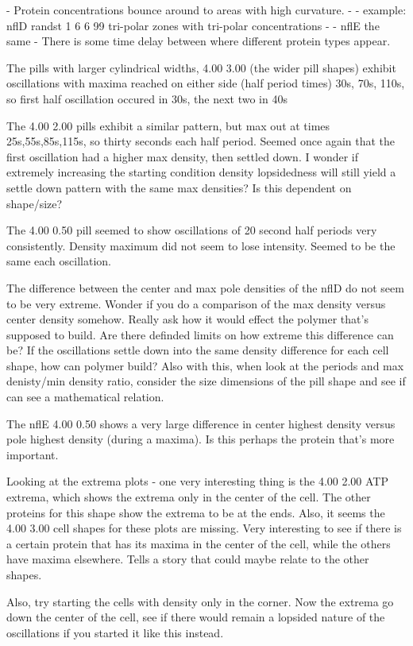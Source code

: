 \documentclass[letterpaper,twocolumn,amsmath,amssymb,pre]{revtex4-1}
\begin{document}
- Protein concentrations bounce around to areas with high curvature.
- - example: nflD randst 1 6 6 99 tri-polar zones with tri-polar concentrations
- - nflE the same
- There is some time delay between where different protein types appear.

The pills with larger cylindrical widths, 4.00 3.00 (the wider pill shapes)
exhibit oscillations with maxima reached on either side (half period
times) 30s, 70s, 110s, so first half oscillation occured in 30s, the
next two in 40s

The 4.00 2.00 pills exhibit a similar pattern, but max out at times
25s,55s,85s,115s, so thirty seconds each half period.  Seemed once again that
the first oscillation had a higher max density, then settled down.  I
wonder if extremely increasing the starting condition density
lopsidedness will still yield a settle down pattern with the same max
densities?  Is this dependent on shape/size?

The 4.00 0.50 pill seemed to show oscillations of 20 second half
periods very consistently.  Density maximum did not seem to lose
intensity.  Seemed to be the same each oscillation.

The difference between the center and max pole densities of the nflD
do not seem to be very extreme.  Wonder if you do a comparison of the
max density versus center density somehow.  Really ask how it would
effect the polymer that's supposed to build.  Are there definded
limits on how extreme this difference can be?  If the oscillations
settle down into the same density difference for each cell shape, how
can polymer build?  Also with this, when look at the periods and max
denisty/min density ratio, consider the size dimensions of the pill
shape and see if can see a mathematical relation.

The nflE 4.00 0.50 shows a very large difference in center highest density
versus pole highest density (during a maxima).  Is this perhaps the
protein that's more important.

Looking at the extrema plots - one very interesting thing is the 4.00
2.00 ATP extrema, which shows the extrema only in the center of the
cell.  The other proteins for this shape show the extrema to be at the
ends.  Also, it seems the 4.00 3.00 cell shapes for these plots are
missing.  Very interesting to see if there is a certain protein that
has its maxima in the center of the cell, while the others have maxima
elsewhere.  Tells a story that could maybe relate to the other shapes.

Also, try starting the cells with density only in the corner.  Now the
extrema go down the center of the cell, see if there would remain a
lopsided nature of the oscillations if you started it like this instead.
\end{document}

